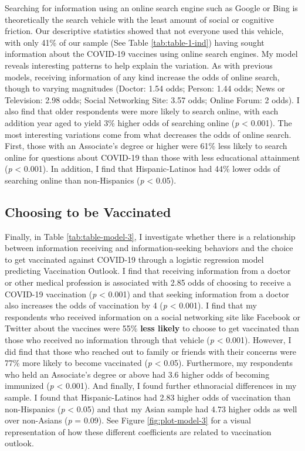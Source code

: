 Searching for information using an online search engine such as Google or Bing
is theoretically the search vehicle with the least amount of social or cognitive
friction. Our descriptive statistics showed that not everyone used this vehicle,
with only 41\% of our sample (See Table \ref{tab:table-1-ind}) having sought
information about the COVID-19 vaccines using online search engines. My model
reveals interesting patterns to help explain the variation. As with previous
models, receiving information of any kind increase the odds of online search,
though to varying magnitudes (Doctor: 1.54 odds; Person: 1.44 odds; News or Television: 2.98 odds; 
Social Networking Site: 3.57 odds; Online Forum: 2 odds). I also find that older respondents
were more likely to search online, with each addition year aged to yield 3\%
higher odds of searching online (\emph{p} \textless{} 0.001). The most interesting variations
come from what decreases the odds of online search. First, those with an
Associate's degree or higher were 61\%
less likely to search online for questions about COVID-19 than those with less
educational attainment (\emph{p} \textless{} 0.001). In addition, I find that Hispanic-Latinos
had 44\% lower odds of searching online than non-Hispanics (\emph{p} \textless{} 0.05).

\hypertarget{vaccination-views}{%
\subsection{Choosing to be Vaccinated}\label{vaccination-views}}



Finally, in Table \ref{tab:table-model-3}, I investigate whether there is a
relationship between information receiving and information-seeking behaviors and
the choice to get vaccinated against COVID-19 through a logistic regression
model predicting Vaccination Outlook. I find that receiving information from a
doctor or other medical profession is associated with 2.85 odds of choosing
to receive a COVID-19 vaccination (\emph{p} \textless{} 0.001) and that seeking 
information from a doctor also increases the odds of vaccination by 4 (\emph{p} \textless{} 0.001).
I find that my respondents who received information on a social networking site
like Facebook or Twitter about the vaccines were 55\%
\textbf{less likely} to choose to get vaccinated than those who received no information through
that vehicle (\emph{p} \textless{} 0.001). However, I did find that those who reached out to
family or friends with their concerns were 77\% more likely to become vaccinated 
(\emph{p} \textless{} 0.05). Furthermore, my respondents who held an Associate's degree
or above had 3.6 higher odds of becoming immunized (\emph{p} \textless{} 0.001).
And finally, I found further ethnoracial differences in my sample. I found that
Hispanic-Latinos had 2.83 higher odds of vaccination than non-Hispanics
(\emph{p} \textless{} 0.05) and that my Asian sample had 4.73 higher odds as well over
non-Asians (\emph{p}  = 0.09). See Figure \ref{fig:plot-model-3} for a visual
representation of how these different coefficients are related to vaccination outlook.

